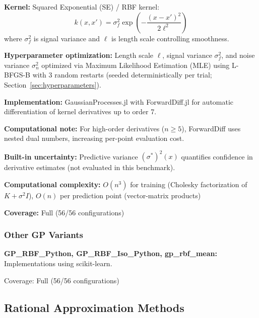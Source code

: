 \textbf{Kernel:} Squared Exponential (SE) / RBF kernel:
\begin{equation}
k(x, x') = \sigma^2_f \exp\left(-\frac{(x - x')^2}{2\ell^2}\right)
\end{equation}
where $\sigma^2_f$ is signal variance and $\ell$ is length scale controlling smoothness.

\textbf{Hyperparameter optimization:} Length scale $\ell$, signal variance $\sigma^2_f$, and noise variance $\sigma^2_n$ optimized via Maximum Likelihood Estimation (MLE) using L-BFGS-B with 3 random restarts (seeded deterministically per trial; Section~\ref{sec:hyperparameters}).

\textbf{Implementation:} GaussianProcesses.jl with ForwardDiff.jl for automatic differentiation of kernel derivatives up to order 7.

\textbf{Computational note:} For high-order derivatives ($n \geq 5$), ForwardDiff uses nested dual numbers, increasing per-point evaluation cost. 

\textbf{Built-in uncertainty:} Predictive variance $(\sigma^*)^2(x)$ quantifies confidence in derivative estimates (not evaluated in this benchmark).

\textbf{Computational complexity:} $O(n^3)$ for training (Cholesky factorization of $K + \sigma^2I$), $O(n)$ per prediction point (vector-matrix products)

\textbf{Coverage:} Full (56/56 configurations)

\subsubsection{Other GP Variants}

\textbf{GP\_RBF\_Python, GP\_RBF\_Iso\_Python, gp\_rbf\_mean:} Implementations using scikit-learn. 

Coverage: Full (56/56 configurations)

\subsection{Rational Approximation Methods}
\label{sec:rational_methods}

